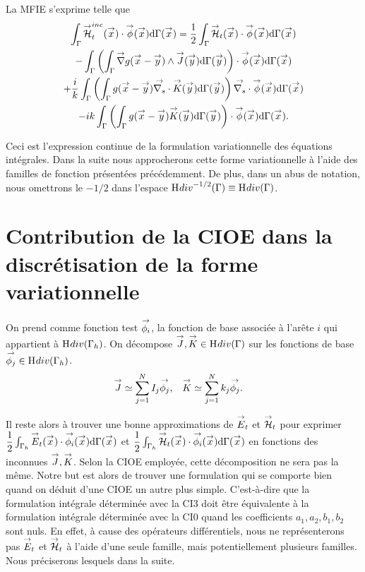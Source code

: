   La MFIE s'exprime telle que
  \begin{multline}
    \label{eq:form_int:MFIE:var}
    \int_{\Gamma} \vH^{inc}_t(\vx) \cdot \vect{\phi}(\vx) \dd{\Gamma}(\vx) =
      \frac{1}{2} \int_{\Gamma} \vH_t(\vx) \cdot \vect{\phi}(\vx) \dd{\Gamma}(\vx) \\
        - \int_{\Gamma} \left( \int_{\Gamma} \vgrad g(\vx - \vy) \pvect \vJ(\vy) \dd{\Gamma}(\vy) \right) \cdot \vect{\phi}(\vx) \dd{\Gamma}(\vx) \\
      + \frac{i}{k} \int_{\Gamma} \left( \int_{\Gamma}  g(\vx - \vy)\vdivs\vK(\vy) \dd{\Gamma}(\vy) \right)\vdivs \vect{\phi}(\vx) \dd{\Gamma}(\vx) \\
        -  ik\int_{\Gamma} \left( \int_{\Gamma} g(\vx - \vy)\vK(\vy) \dd{\Gamma}(\vy) \right) \cdot \vect{\phi}(\vx) \dd{\Gamma}(\vx).
  \end{multline}

  Ceci est l'expression continue de la formulation variationnelle des équations intégrales. Dans la suite nous approcherons cette forme variationnelle à l'aide des familles de fonction présentées précédemment. De plus, dans un abus de notation, nous omettrons le \(-1/2\) dans l'espace \(\Sobolev[div]^{-1/2}(\Gamma)\equiv\Sobolev[div](\Gamma)\).


\section{Contribution de la CIOE dans la discrétisation de la forme variationnelle}

  On prend comme fonction test \(\phii\), la fonction de base associée à l'arête \(i\) qui appartient à \(\Hdiv(\Gamma_h)\).
  On décompose \(\vJ,\vK \in \Hdiv(\Gamma)\) sur les fonctions de base \(\phij \in \Hdiv(\Gamma_h)\).
    \begin{align*}
      \vJ & \simeq \sum_{j=1}^N I_j \phij,
      &
      \vK & \simeq \sum_{j=1}^N k_j \phij.
    \end{align*}

  Il reste alors à trouver une bonne approximations de \(\vE_t\) et \(\vH_t\) pour exprimer \( \frac{1}{2} \int_{\Gamma_h} \vE_t(\vx) \cdot \phii(\vx) \dd{\Gamma}(\vx)\) et \(\frac{1}{2} \int_{\Gamma_h} \vH_t(\vx) \cdot \phii(\vx) \dd{\Gamma}(\vx)\) en fonctions des inconnues \(\vJ, \vK\). Selon la CIOE employée, cette décomposition ne sera pas la même. Notre but est alors de trouver une formulation qui se comporte bien quand on déduit d'une CIOE un autre plus simple. C'est-à-dire que la formulation intégrale déterminée avec la CI3 doit être équivalente à la formulation intégrale déterminée avec la CI0 quand les coefficients \(a_1,a_2,b_1,b_2\) sont nuls. En effet, à cause des opérateurs différentiels, nous ne représenterons pas \(\vE_t\) et \(\vH_t\) à l'aide d'une seule famille, mais potentiellement plusieurs familles. Nous préciserons lesquels dans la suite.

